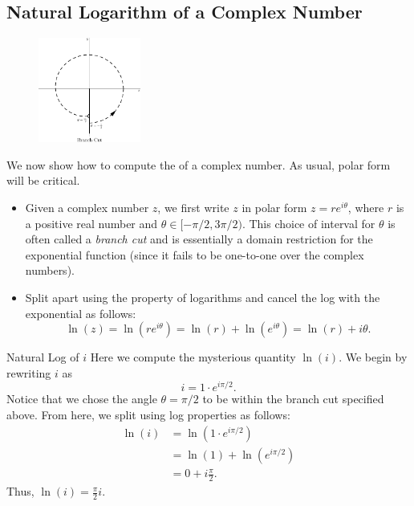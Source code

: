 \subsection{Natural Logarithm of a Complex Number}\label{ComplexLogs}

\begin{figure}
    	\centering
		\includegraphics[width=0.3\textwidth]{ChapterComplex/Figures/BranchCut}
\end{figure}

We now show how to compute the  of a complex number.  As usual, polar form will be critical.

\begin{itemize}
\item Given a complex number $z$, we first write $z$ in polar form $z=re^{i\theta}$, where $r$ is a positive real number and $\theta \in [-\pi/2,3\pi/2)$.  This choice of interval for $\theta$ is often called a \emph{branch cut} and is essentially a domain restriction for the exponential function (since it fails to be one-to-one over the complex numbers).

\item Split apart using the property of logarithms and cancel the log with the exponential as follows: $$ \ln(z)=\ln\left( re^{i\theta}\right)=\ln(r)+\ln\left( e^{i\theta} \right) =\ln(r)+i\theta.$$
\end{itemize}

\vspace*{.1in}

\begin{example}{Natural Log of $i$}\label{LogOfi}
Here we compute the mysterious quantity $\ln(i)$.  We begin by rewriting $i$ as $$i=1\cdot e^{i\pi/2}. $$  Notice that we chose the angle $\theta=\pi/2$ to be within the branch cut specified above.  From here, we split using log properties as follows:  \begin{align*}
\ln(i)&=\ln\left(1\cdot e^{i\pi/2} \right)\\
&=\ln\left(1  \right) + \ln\left(e^{i\pi/2}  \right)\\
&=0 + i\frac{\pi}{2}. 
\end{align*}
Thus, $\ln(i)=\frac{\pi}{2}i.$
\end{example}

